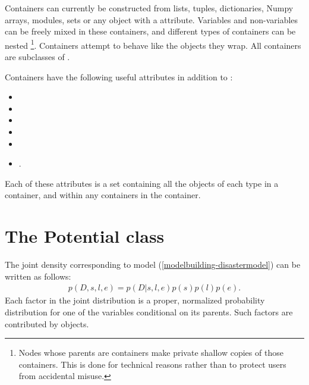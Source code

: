 \documentclass[letterpaper,10pt,english]{sphinxmanual}
\begin{document}
Containers can currently be constructed from lists, tuples, dictionaries, Numpy arrays, modules, sets or any object with a  attribute. Variables and non-variables can be freely mixed in these containers, and different types of containers can be nested \footnote{
Nodes whose parents are containers make private shallow copies of those
containers. This is done for technical reasons rather than to protect users from
accidental misuse.
}. Containers attempt to behave like the objects they wrap. All containers are subclasses of .

Containers have the following useful attributes in addition to :
\begin{itemize}
\item {} 

\item {} 

\item {} 

\item {} 

\item {} 

\item {} 
.

\end{itemize}

Each of these attributes is a set containing all the objects of each type in a
container, and within any containers in the container.


\section{The Potential class}
\label{modelbuilding:potential}\label{modelbuilding:the-potential-class}
The joint density corresponding to model (\eqref{modelbuilding-disastermodel}) can be written
as follows:
\begin{eqnarray*}
    p(D,s,l,e) = p(D|s,l,e) p(s) p(l) p(e).
\end{eqnarray*}
Each factor in the joint distribution is a proper, normalized probability distribution for one of the variables conditional on its parents. Such factors are contributed by  objects.
\end{document}
